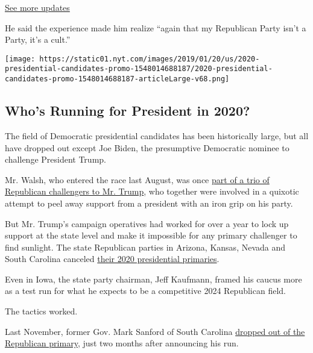 \href{https://www.nytimes.com/2020/07/31/us/elections/biden-vs-trump.html?action=click\&pgtype=Article\&state=default\&region=MAIN_CONTENT_1\&context=storylines_live_updates}{See
more updates}

He said the experience made him realize ``again that my Republican Party
isn't a Party, it's a cult.''

\href{https://www.nytimes.com/interactive/2019/us/politics/2020-presidential-candidates.html}{}

\texttt{[image: https://static01.nyt.com/images/2019/01/20/us/2020-presidential-candidates-promo-1548014688187/2020-presidential-candidates-promo-1548014688187-articleLarge-v68.png]}

\hypertarget{whos-running-for-president-in-2020}{%
\subsection{Who's Running for President in
2020?}\label{whos-running-for-president-in-2020}}

The field of Democratic presidential candidates has been historically
large, but all have dropped out except Joe Biden, the presumptive
Democratic nominee to challenge President Trump.

Mr. Walsh, who entered the race last August, was once
\href{https://www.nytimes.com/2019/09/19/us/politics/trump-republicans-challengers.html}{part
of a trio of Republican challengers to Mr. Trump}, who together were
involved in a quixotic attempt to peel away support from a president
with an iron grip on his party.

But Mr. Trump's campaign operatives had worked for over a year to lock
up support at the state level and make it impossible for any primary
challenger to find sunlight. The state Republican parties in Arizona,
Kansas, Nevada and South Carolina canceled
\href{https://www.nytimes.com/2019/09/06/us/politics/states-drop-republican-primaries.html}{their
2020 presidential primaries}.

Even in Iowa, the state party chairman, Jeff Kaufmann, framed his caucus
more as a test run for what he expects to be a competitive 2024
Republican field.

The tactics worked.

Last November, former Gov. Mark Sanford of South Carolina
\href{https://www.nytimes.com/2019/11/12/us/politics/mark-sanford-2020.html}{dropped
out of the Republican primary}, just two months after announcing his
run.

